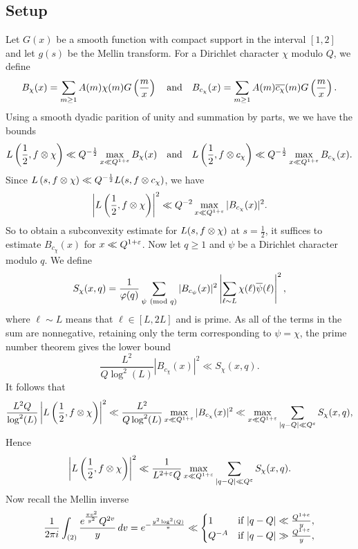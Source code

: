 \documentclass[12pt,reqno,oneside]{amsart}
\begin{document}
  \subsection*{Setup}
    Let $G(x)$ be a smooth function with compact support in the interval $[1,2]$ and let $g(s)$ be the Mellin transform.
    For a Dirichlet character $\chi$ modulo $Q$, we define
    \[
      B_{\chi}(x) = \sum_{m \ge 1}A(m)\chi(m)G\left(\frac{m}{x}\right) \quad \text{and} \quad B_{c_{\chi}}(x) = \sum_{m \ge 1}A(m)\overline{c_{\chi}}(m)G\left(\frac{m}{x}\right).
    \]
    Using a smooth dyadic parition of unity and summation by parts, we we have the bounds
    \[
      L\left(\frac{1}{2},f \otimes \chi \right) \ll Q^{-\frac{1}{2}}\max_{x \ll Q^{1+\varepsilon}}B_{\chi}(x) \quad \text{and} \quad L\left(\frac{1}{2},f \otimes c_{\chi} \right) \ll Q^{-\frac{1}{2}}\max_{x \ll Q^{1+\varepsilon}}B_{c_{\chi}}(x).
    \]
    Since $L\left(s,f \otimes \chi\right) \ll Q^{-\frac{1}{2}}L(s,f \otimes c_{\chi})$, we have
    \[
      \left|L\left(\frac{1}{2},f \otimes \chi \right)\right|^{2} \ll Q^{-2}\max_{x \ll Q^{1+\varepsilon}}|B_{c_{\chi}}(x)|^{2}.
    \]
    So to obtain a subconvexity estimate for $L(s,f \otimes \chi)$ at $s = \frac{1}{2}$, it suffices to estimate $B_{c_{\chi}}(x)$ for $x \ll Q^{1+\varepsilon}$. Now let $q \ge 1$ and $\psi$ be a Dirichlet character modulo $q$. We define
    \[
      S_{\chi}(x,q) = \frac{1}{\varphi(q)}\sum_{\psi \ \left(\text{mod }q\right)}|B_{c_{\psi}}(x)|^{2}\left|\sum_{\ell \sim L}\chi(\ell)\overline{\psi}(\ell)\right|^{2},
    \]
    where $\ell \sim L$ means that $\ell \in [L,2L]$ and is prime. As all of the terms in the sum are nonnegative, retaining only the term corresponding to $\psi = \chi$, the prime number theorem gives the lower bound
    \[
      \frac{L^{2}}{Q\log^{2}(L)}|B_{c_{\chi}}(x)|^{2} \ll S_{\chi}(x,q).
    \]
    It follows that
    \[
      \frac{L^{2}Q}{\log^{2}(L)}\left|L\left(\frac{1}{2},f \otimes \chi \right)\right|^{2} \ll \frac{L^{2}}{Q\log^{2}(L)}\max_{x \ll Q^{1+\varepsilon}}|B_{c_{\chi}}(x)|^{2} \ll \max_{x \ll Q^{1+\varepsilon}}\sum_{|q-Q| \ll Q^{\varepsilon}}S_{\chi}(x,q),
    \]
    Hence
    \[
      \left|L\left(\frac{1}{2},f \otimes \chi \right)\right|^{2} \ll \frac{1}{L^{2+\varepsilon}Q}\max_{x \ll Q^{1+\varepsilon}}\sum_{|q-Q| \ll Q^{\varepsilon}}S_{\chi}(x,q).
    \]
    Now recall the Mellin inverse
    \[
      \frac{1}{2\pi i}\int_{(2)}\frac{e^{\frac{\pi v^{2}}{y^{2}}}Q^{2v}}{y}\,dv = e^{-\frac{y^{2}\log^{2}(Q)}{\pi}} \ll \begin{cases} 1 & \text{if $|q-Q| \ll \frac{Q^{1+e}}{y}$}, \\ Q^{-A} & \text{if $|q-Q| \gg \frac{Q^{1+\varepsilon}}{y}$}, \end{cases}
    \]
\end{document}
